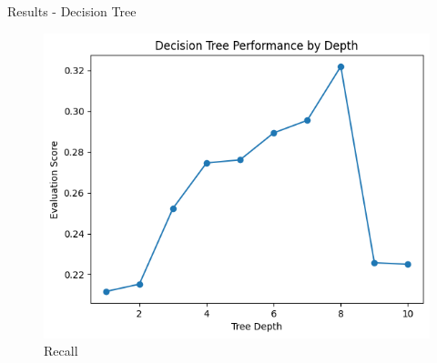 \documentclass{beamer}
\begin{document}
\begin{frame}[t]{Results - Decision Tree}
\begin{figure}[h]
\begin{minipage}{0.3\textwidth}
		\includegraphics[width=\linewidth]{images/DecisionTree/recall.png}
		\caption{Recall}
	\end{minipage}
\end{figure}
\end{frame}
\end{document}
